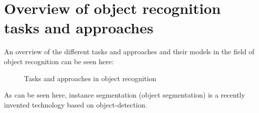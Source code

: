 \section{Overview of object recognition tasks and approaches}

An overview of the different tasks and approaches and their models  in the field of object recognition can be seen here:

\begin{figure}[H]
	\caption{\label{fig:object-recognition} Tasks and approaches in object recognition}
\end{figure}

As can be seen here, instance segmentation (object segmentation) is a recently invented technology based on object-detection.